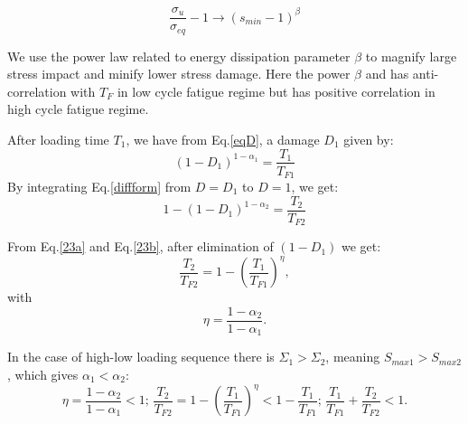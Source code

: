 \documentclass[3p,times,number,review]{elsarticle}
\begin{document}
$$\frac{\sigma_{u}}{\sigma_{eq}} -1 \longrightarrow \left( s_{min}-1\right) ^\beta $$

We use the power law related to energy dissipation parameter $\beta$ to magnify large stress impact and minify lower stress damage. Here the power $\beta$ and has anti-correlation with $T_F$ in low cycle fatigue regime but has positive correlation in high cycle fatigue regime. 

After loading time $T_1$, we have from Eq.\eqref{eqD}, a damage $D_1$ given by:
\begin{equation}
\left( 1-D_1\right) ^{1-\alpha_1}=\dfrac{T_1}{T_{F1}}
\label{23a}
\end{equation}
By integrating Eq.\eqref{diffform} from $D=D_1$ to $D=1$, we get:
\begin{equation}
1-\left( 1-D_1\right)^{1-\alpha_2}=\dfrac{T_2}{T_{F2}}
\label{23b}
\end{equation}

From Eq.\eqref{23a} and Eq.\eqref{23b}, after elimination of $\left( 1-D_1\right)$ we get:
\begin{equation} 
\dfrac{T_2}{T_{F2}} =1-\left( \dfrac{T_1}{T_{F1}}\right) ^\eta,
\end{equation}
with
\begin{equation}
\eta=\dfrac{1-\alpha_2}{1-\alpha_1}.
\label{eq.eta}
\end{equation}

In the case of high-low loading sequence there is $\Sigma_1>\Sigma_2$, meaning $S_{max1}>S_{max2}$, which gives $\alpha_1<\alpha_2$:
$$\eta=\frac{1-\alpha_2}{1-\alpha_1}<1;\,
 \frac{T_2}{T_{F2}}=1-\left( \frac{T_1}{T_{F1}}\right) ^\eta<1-\frac{T_1}{T_{F1}};\,
\frac{T_1}{T_{F1}}+\frac{T_2}{T_{F2}}<1.$$
\end{document}

